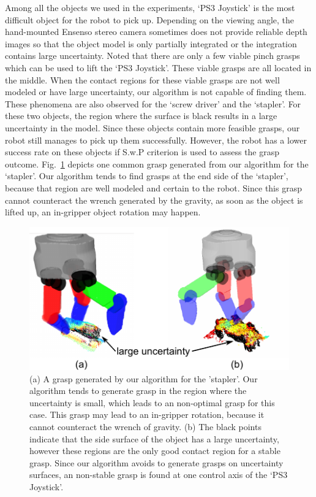 Among all the objects we used in the experiments, `PS3 Joystick' is the most difficult object for the robot to pick up. Depending on the viewing angle, the hand-mounted Ensenso stereo camera sometimes does not provide reliable depth images so that the object model is only partially integrated or the integration contains large uncertainty. Noted that there are only a few viable pinch grasps which can be used to lift the `PS3 Joystick'. These viable grasps are all located in the middle. When the contact regions for these viable grasps are not well modeled or have large uncertainty, our algorithm is not capable of finding them. These phenomena are also observed for the `screw driver' and the `stapler'. For these two objects, the region where the surface is black results in a large uncertainty in the model. Since these objects contain more feasible grasps, our robot still manages to pick up them successfully. However, the robot has a lower success rate on these objects if S.w.P criterion is used to assess the grasp outcome. Fig.~\ref{fig:slip_staple} depicts one common grasp generated from our algorithm for the `stapler'. Our algorithm tends to find grasps at the end side  of the `stapler', because that region are well modeled and certain to the robot. Since this grasp cannot counteract the wrench generated by the gravity, as soon as the object is lifted up, an in-gripper  object rotation may happen.   

\begin{figure}[!htpb]
\centering
\includegraphics[width=0.7\linewidth]{figure/non_optimal_grasp.pdf}
\caption{(a) A grasp generated by our algorithm for the 'stapler'. Our algorithm tends to generate grasp in the region where the uncertainty is small, which leads to an non-optimal grasp for this case. This grasp may lead to an in-gripper rotation, because it cannot counteract the wrench of gravity. (b) The black points indicate that the side surface of the object has a large uncertainty, however these regions are the only good contact region for a stable grasp. Since our algorithm avoids to generate grasps on uncertainty surfaces, an non-stable grasp is found at one control axis of the `PS3 Joystick'.}
\label{fig:slip_staple} 
\end{figure}

